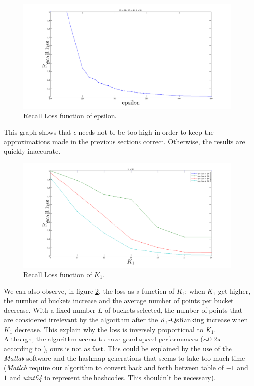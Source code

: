 \documentclass{article}
\begin{document}
\begin{figure}[htbp]
	\begin{center}
	\includegraphics[width=.8\linewidth]{Images/rloss.png}
	\end{center}
	\caption{Recall Loss function of epsilon.}
	\label{fig:rloss}
\end{figure}

This graph shows that $\epsilon$ needs not to be too high in order to keep the approximations made in the previous sections correct. Otherwise, the results are quickly inaccurate.

\begin{figure}[htbp]
	\begin{center}
	\includegraphics[width=.8\linewidth]{Images/k1_rloss.png}
	\end{center}
	\caption{Recall Loss function of $K_1$.}
	\label{fig:k1_rloss}
\end{figure}

We can also observe, in figure \ref{fig:k1_rloss}, the loss as a function of $K_1$: when $K_1$ get higher, the number of buckets increase and the average number of points per bucket decrease. With a fixed number $L$ of buckets selected, the number of points that are considered irrelevant by the algorithm after the $K_1$-QsRanking increase when $K_1$ decrease. This explain why the loss is inversely proportional to $K_1$.\\

Although, the algorithm seems to have good speed performances ($\sim 0.2s$ according to \citep{QSRank}), ours is not as fast. This could be explained by the use of the \textit{Matlab} software and the hashmap generations that seems to take too much time (\textit{Matlab} require our algorithm to convert back and forth between table of $-1$ and $1$ and \textit{uint64} to represent the hashcodes. This shouldn't be necessary).
\end{document}
